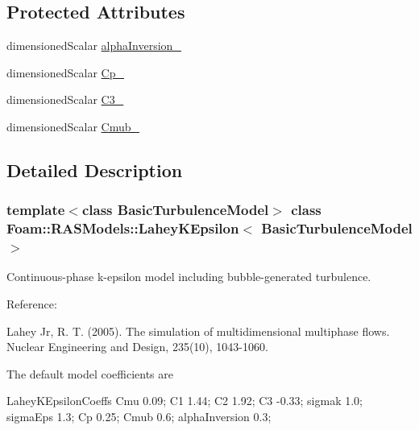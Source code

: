 \subsection*{Protected Attributes}
\begin{DoxyCompactItemize}
\item 
dimensioned\+Scalar \hyperlink{classFoam_1_1RASModels_1_1LaheyKEpsilon_a5f7c84ea08322c9c0d8f86c390a72963}{alpha\+Inversion\+\_\+}
\item 
dimensioned\+Scalar \hyperlink{classFoam_1_1RASModels_1_1LaheyKEpsilon_a928506392267e759f5e7065ea4ce1dcb}{Cp\+\_\+}
\item 
dimensioned\+Scalar \hyperlink{classFoam_1_1RASModels_1_1LaheyKEpsilon_aed8039605824e63ab9ac285e15c70bb7}{C3\+\_\+}
\item 
dimensioned\+Scalar \hyperlink{classFoam_1_1RASModels_1_1LaheyKEpsilon_a66f9d5abafee7f0bd61babed106fc733}{Cmub\+\_\+}
\end{DoxyCompactItemize}


\subsection{Detailed Description}
\subsubsection*{template$<$class Basic\+Turbulence\+Model$>$\newline
class Foam\+::\+R\+A\+S\+Models\+::\+Lahey\+K\+Epsilon$<$ Basic\+Turbulence\+Model $>$}

Continuous-\/phase k-\/epsilon model including bubble-\/generated turbulence. 

\label{_Description}%
 Reference\+: \begin{DoxyVerb}    Lahey Jr, R. T. (2005).
    The simulation of multidimensional multiphase flows.
    Nuclear Engineering and Design, 235(10), 1043-1060.
\end{DoxyVerb}


The default model coefficients are \begin{DoxyVerb}    LaheyKEpsilonCoeffs
    {
        Cmu             0.09;
        C1              1.44;
        C2              1.92;
        C3              -0.33;
        sigmak          1.0;
        sigmaEps        1.3;
        Cp              0.25;
        Cmub            0.6;
        alphaInversion  0.3;
    }
\end{DoxyVerb}


